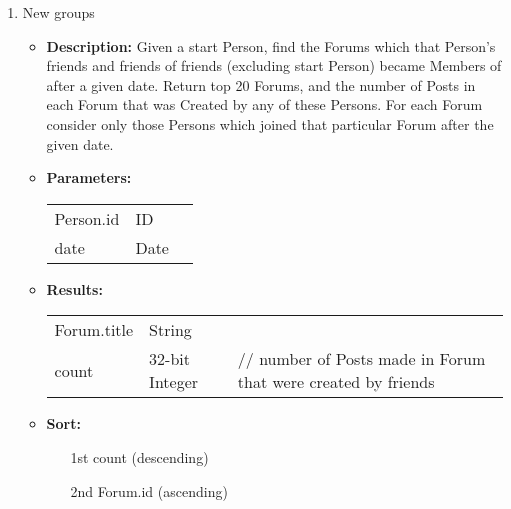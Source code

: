 {\begin{enumerate}
        \item New groups
            \begin{itemize}
                \item \textbf{Description:}
                    Given a start Person, find the Forums which that Person's friends
                    and friends of friends (excluding start Person) became Members of
                    after a given date.  Return top 20 Forums, and the number of Posts
                    in each Forum that was Created by any of these Persons.  For each
                    Forum consider only those Persons which joined that particular
                    Forum after the given date.  
                \item \textbf{Parameters:} \\
                    \begin{tabular}{lll}
                        Person.id 										& ID & \\
                        date 											& Date & \\
                    \end{tabular}		
                \item \textbf{Results:} \\
                    \begin{tabular}{lll}
                        Forum.title 										& String & \\
                        count 	 											& 32-bit Integer & \parbox[t]{20cm}{// number of Posts made in Forum that were created 																							by friends \par \strut} \\
                    \end{tabular}		
                \item \textbf{Sort:}
                  \begin{itemize}
                    \item[1st] count (descending)
                    \item[2nd] Forum.id (ascending)
                  \end{itemize}
            \end{itemize}


\end{enumerate}}
